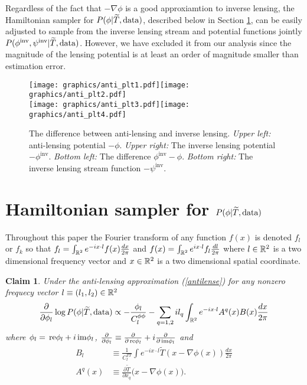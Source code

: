 \documentclass[noinfoline]{imsart}
\newtheorem{claim}{Claim}
\newcommand{\re}{\text{\,\rm re}}
\newcommand{\im}{\text{\,\rm im}}
\begin{document}
Regardless of the fact that $-\nabla\phi$ is a good approxiamtion to inverse lensing, the Hamiltonian sampler for $P(\phi | \widetilde T,  \text{\rm data})$, described below in Section \ref{Section: hamiltonian sampler section},  can be easily adjusted to sample from the inverse lensing stream and potential functions jointly $P(\phi^\text{inv},\psi^\text{inv} | \widetilde T,  \text{\rm data})$.   However, we have excluded it from our analysis since the magnitude of the lensing potential is at least an order of magnitude smaller than estimation error. 

\begin{figure}[H]
\label{antilensing plots}
\texttt{[image: graphics/anti\_plt1.pdf]}\texttt{[image: graphics/anti\_plt2.pdf]}\\%
\texttt{[image: graphics/anti\_plt3.pdf]}\texttt{[image: graphics/anti\_plt4.pdf]}
\caption{The difference between anti-lensing and inverse lensing. {\em Upper left:} anti-lensing potential $-\phi$. {\em Upper right:} The inverse lensing potential $-\phi^\text{inv}$. {\em Bottom left:} The difference $\phi^\text{inv}-\phi$. {\em Bottom right:} The inverse lensing stream function $-\psi^\text{inv}$.}
\end{figure}










%
%
\section{Hamiltonian sampler for $P(\phi | \widetilde T,  \text{\rm data})$}
\label{Section: hamiltonian sampler section}


Throughout this paper the Fourier transform of any function $f(x)$ is denoted $f_l$ or $f_k$ so that
$f_l  =  \int_{\Bbb R^2} e^{-i x\cdot l}  f(x)\frac{dx}{2\pi}$ and
$f(x) =  \int_{\Bbb R^2} e^{i x\cdot l}  f_l \frac{dl}{2\pi}$ 
where $l\in \Bbb R^2$ is a two dimensional frequency vector and $x\in \Bbb R^2$  is a two dimensional spatial coordinate.

\begin{claim}
\label{grad claim}
 Under the anti-lensing approximation (\ref{antilense}) for any nonzero frequecy vector $l\equiv (l_1, l_2) \in \Bbb R^2$ 
 \[\frac{\partial}{\partial \phi_l}\log P(\phi | \widetilde T,  \text{\rm data}) \propto -  \frac{\phi_l}{C^{\phi\phi}_{l}} -  \sum_{q=1,2} i  l_q \int_{\Bbb R^2} e^{-i x\cdot l} A^q(x)B(x) \frac{dx}{2\pi}   \]
 where  $\phi_l = \re \phi_l + i \im \phi_l$, $\frac{\partial}{\partial \phi_l}\equiv \frac{\partial}{\partial\re \phi_l} + i \frac{\partial}{\partial\im\phi_l}$ and 
 \begin{align}
 B_l &\equiv \frac{1}{C_l^{TT}} \int e^{-i x\cdot l}  \widetilde T(x-\nabla \phi(x))\frac{dx}{2\pi} \\ 
 A^q(x) &\equiv \frac{\partial\widetilde T}{\partial x_q}\bigl(x-\nabla \phi(x)\bigr).
 \end{align}
\end{claim}
\end{document}
